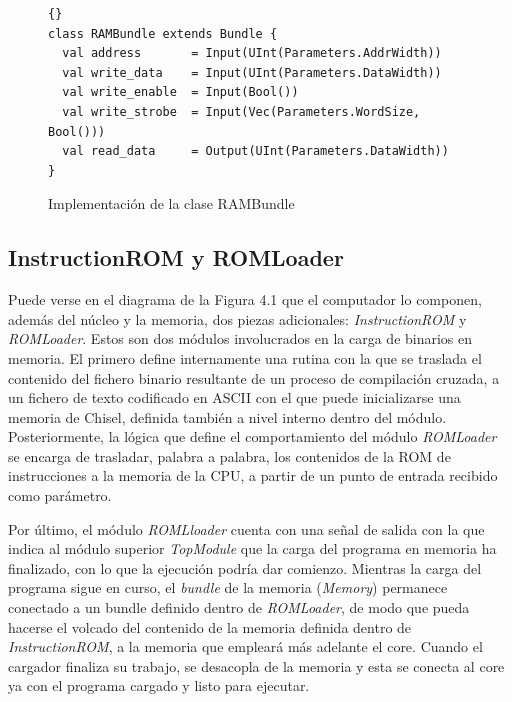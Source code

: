 \begin{figure}[h]
\begin{lstlisting}[style=scalaStyle]{}
class RAMBundle extends Bundle {
  val address       = Input(UInt(Parameters.AddrWidth))
  val write_data    = Input(UInt(Parameters.DataWidth))
  val write_enable  = Input(Bool())
  val write_strobe  = Input(Vec(Parameters.WordSize, Bool()))
  val read_data     = Output(UInt(Parameters.DataWidth))
}
\end{lstlisting}
\caption{Implementación de la clase RAMBundle}
\end{figure}

\subsection{InstructionROM y ROMLoader}

Puede verse en el diagrama de la Figura 4.1 que el computador lo componen, además del núcleo y la memoria, dos piezas adicionales: \textit{InstructionROM} y \textit{ROMLoader}. Estos son dos módulos involucrados en la carga de binarios en memoria. El primero define internamente una rutina con la que se traslada el contenido del fichero binario resultante de un proceso de compilación cruzada, a un fichero de texto codificado en ASCII con el que puede inicializarse una memoria de Chisel, definida también a nivel interno dentro del módulo. Posteriormente, la lógica que define el comportamiento del módulo \textit{ROMLoader} se encarga de trasladar, palabra a palabra, los contenidos de la ROM de instrucciones a la memoria de la CPU, a partir de un punto de entrada recibido como parámetro.

Por último, el módulo \textit{ROMLloader} cuenta con una señal de salida con la que indica al módulo superior \textit{TopModule} que la carga del programa en memoria ha finalizado, con lo que la ejecución podría dar comienzo. Mientras la carga del programa sigue en curso, el \textit{bundle} de la memoria (\textit{Memory}) permanece conectado a un bundle definido dentro de \textit{ROMLoader}, de modo que pueda hacerse el volcado del contenido de la memoria definida dentro de \textit{InstructionROM}, a la memoria que empleará más adelante el core. Cuando el cargador finaliza su trabajo, se desacopla de la memoria y esta se conecta al core ya con el programa cargado y listo para ejecutar.

